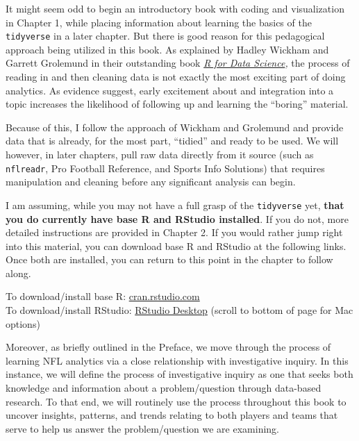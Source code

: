 \documentclass[
  letterpaper,
]{krantz}
\begin{document}
It might seem odd to begin an introductory book with coding and
visualization in Chapter 1, while placing information about learning the
basics of the \texttt{tidyverse} in a later chapter. But there is good
reason for this pedagogical approach being utilized in this book. As
explained by Hadley Wickham and Garrett Grolemund in their outstanding
book \href{https://r4ds.had.co.nz/index.html}{\emph{R for Data
Science}}\emph{,} the process of reading in and then cleaning data is
not exactly the most exciting part of doing analytics. As evidence
suggest, early excitement about and integration into a topic increases
the likelihood of following up and learning the ``boring'' material.

Because of this, I follow the approach of Wickham and Grolemund and
provide data that is already, for the most part, ``tidied'' and ready to
be used. We will however, in later chapters, pull raw data directly from
it source (such as \texttt{nflreadr}, Pro Football Reference, and Sports
Info Solutions) that requires manipulation and cleaning before any
significant analysis can begin.

\begin{tcolorbox}[enhanced jigsaw, colback=white, leftrule=.75mm, breakable, colframe=quarto-callout-important-color-frame, bottomtitle=1mm, rightrule=.15mm, left=2mm, opacityback=0, bottomrule=.15mm, arc=.35mm, coltitle=black, colbacktitle=quarto-callout-important-color!10!white, toptitle=1mm, titlerule=0mm, title=\textcolor{quarto-callout-important-color}{\faExclamation}\hspace{0.5em}{Important}, toprule=.15mm, opacitybacktitle=0.6]

I am assuming, while you may not have a full grasp of the
\texttt{tidyverse} yet, \textbf{that you do currently have base R and
RStudio installed}. If you do not, more detailed instructions are
provided in Chapter 2. If you would rather jump right into this
material, you can download base R and RStudio at the following links.
Once both are installed, you can return to this point in the chapter to
follow along.

To download/install base R:
\href{https://cran.rstudio.com/}{cran.rstudio.com}\\
To download/install RStudio:
\href{https://posit.co/download/rstudio-desktop/}{RStudio Desktop}
(scroll to bottom of page for Mac options)

\end{tcolorbox}

Moreover, as briefly outlined in the Preface, we move through the
process of learning NFL analytics via a close relationship with
investigative inquiry. In this instance, we will define the process of
investigative inquiry as one that seeks both knowledge and information
about a problem/question through data-based research. To that end, we
will routinely use the process throughout this book to uncover insights,
patterns, and trends relating to both players and teams that serve to
help us answer the problem/question we are examining.
\end{document}
